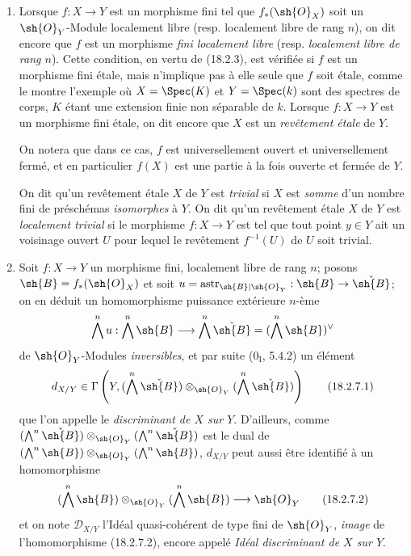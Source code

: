 \begin{remarks}[18.2.7]
\begin{enumerate}
  \item[(i)] Lorsque $f:X\to Y$ est un morphisme fini tel que $f_*(\sh{O}_X)$ soit un $\sh{O}_Y$-Module localement libre (resp. localement libre de rang $n$), on dit encore que $f$ est un morphisme \emph{fini localement libre} (resp. \emph{localement libre de rang $n$}). Cette condition, en vertu de (18.2.3), est vérifiée si $f$ est un morphisme fini étale, mais n'implique pas à elle seule que $f$ soit étale, comme le montre l'exemple où $X=\Spec(K)$ et $Y=\Spec(k)$ sont des spectres de corps, $K$ étant une extension finie non séparable de $k$. Lorsque $f:X\to Y$ est un morphisme fini étale, on dit encore que $X$ est un \emph{revêtement étale} de $Y$.

On notera que dans ce cas, $f$ est universellement ouvert et universellement fermé, et en particulier $f(X)$ est une partie à la fois ouverte et fermée de $Y$.

On dit qu'un revêtement étale $X$ de $Y$ est \emph{trivial} si $X$ est \emph{somme} d'un nombre fini de préschémas \emph{isomorphes} à $Y$. On dit qu'un revêtement étale $X$ de $Y$ est \emph{localement trivial} si le morphisme $f:X\to Y$ est tel que tout point $y\in Y$ ait un voisinage ouvert $U$ pour lequel le revêtement $f^{-1}(U)$ de $U$ soit trivial.

  \item[(ii)] Soit $f:X\to Y$ un morphisme fini, localement libre de rang $n$; posons $\sh{B}=f_*(\sh{O}_X)$ et soit $u=\operatorname{astr}_{\sh{B}|\sh{O}_Y}:\sh{B}\to\check{\sh{B}}$; on en déduit un homomorphisme puissance extérieure $n$-ème
\[
  \bigwedge^n u:\bigwedge^n\sh{B}\longrightarrow\bigwedge^n\check{\sh{B}}=(\bigwedge^n\sh{B})^\vee
\]
de $\sh{O}_Y$-Modules \emph{inversibles}, et par suite ($0_{\mathrm I}$, 5.4.2) un élément
\begin{equation}
  d_{X/Y}\in\Gamma\left(Y,(\bigwedge^n\check{\sh{B}})\otimes_{\sh{O}_Y}(\bigwedge^n\check{\sh{B}})\right)
  \tag{18.2.7.1}\label{IV.18.2.7.1}
\end{equation}
que l'on appelle le \emph{discriminant de $X$ sur $Y$}. D'ailleurs, comme $(\bigwedge^n\check{\sh{B}})\otimes_{\sh{O}_Y}(\bigwedge^n\check{\sh{B}})$ est le dual de $(\bigwedge^n\sh{B})\otimes_{\sh{O}_Y}(\bigwedge^n\sh{B})$, $d_{X/Y}$ peut aussi être identifié à un homomorphisme
\begin{equation}
  (\bigwedge^n\sh{B})\otimes_{\sh{O}_Y}(\bigwedge^n\sh{B})\longrightarrow\sh{O}_Y
  \tag{18.2.7.2}\label{IV.18.2.7.2}
\end{equation}
et on note $\mathscr{D}_{X/Y}$ l'Idéal quasi-cohérent de type fini de $\sh{O}_Y$, \emph{image} de l'homomorphisme (18.2.7.2), encore appelé \emph{Idéal discriminant de $X$ sur $Y$}.
\end{enumerate}
\end{remarks}

